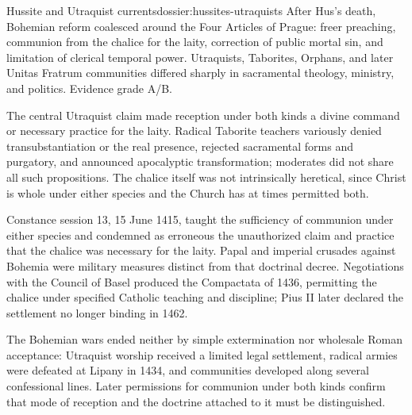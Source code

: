 \begin{heresydossier}{Hussite and Utraquist currents}{dossier:hussites-utraquists}
\objectfield After Hus's death, Bohemian reform coalesced around the Four Articles of Prague: freer preaching, communion from the chalice for the laity, correction of public mortal sin, and limitation of clerical temporal power. Utraquists, Taborites, Orphans, and later Unitas Fratrum communities differed sharply in sacramental theology, ministry, and politics. Evidence grade A/B.

\propositionfield The central Utraquist claim made reception under both kinds a divine command or necessary practice for the laity. Radical Taborite teachers variously denied transubstantiation or the real presence, rejected sacramental forms and purgatory, and announced apocalyptic transformation; moderates did not share all such propositions. The chalice itself was not intrinsically heretical, since Christ is whole under either species and the Church has at times permitted both.

\responsefield Constance session 13, 15 June 1415, taught the sufficiency of communion under either species and condemned as erroneous the unauthorized claim and practice that the chalice was necessary for the laity. Papal and imperial crusades against Bohemia were military measures distinct from that doctrinal decree. Negotiations with the Council of Basel produced the Compactata of 1436, permitting the chalice under specified Catholic teaching and discipline; Pius II later declared the settlement no longer binding in 1462.

\aftermathfield The Bohemian wars ended neither by simple extermination nor wholesale Roman acceptance: Utraquist worship received a limited legal settlement, radical armies were defeated at Lipany in 1434, and communities developed along several confessional lines. Later permissions for communion under both kinds confirm that mode of reception and the doctrine attached to it must be distinguished.
\end{heresydossier}


